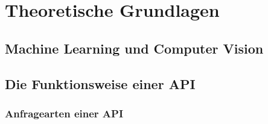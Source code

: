 \chapter{Theoretische Grundlagen} \label{chap:theoretische_grundlagen}  %


\section{Machine Learning und Computer Vision} \label{sec:ml_cv}  %


\section{Die Funktionsweise einer API} \label{sec:api}  %

\subsection{Anfragearten einer API} \label{subsec:anfragearten_einer_api}  %